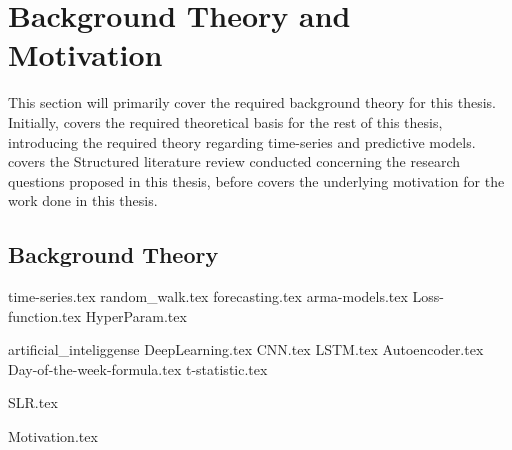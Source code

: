 \chapter{Background Theory and Motivation}\label{T-B}
\label{cha:TheoryAndBackground}


This section will primarily cover the required background theory for this thesis.
Initially,  covers the required theoretical basis for the rest of this thesis,
introducing the required theory regarding time-series and predictive models.
 covers the Structured literature review conducted concerning the research questions proposed in this thesis,
before  covers the underlying motivation for the work done in this thesis.



\section{Background Theory}
\label{section:BT:BackgroundTheory}
{time-series.tex}
{random_walk.tex}
{forecasting.tex}
{arma-models.tex}
{Loss-function.tex}
{HyperParam.tex}

{artificial_inteliggense}
{DeepLearning.tex}
{CNN.tex}
{LSTM.tex}
{Autoencoder.tex}
{Day-of-the-week-formula.tex}
{t-statistic.tex}



{SLR.tex}


{Motivation.tex}

